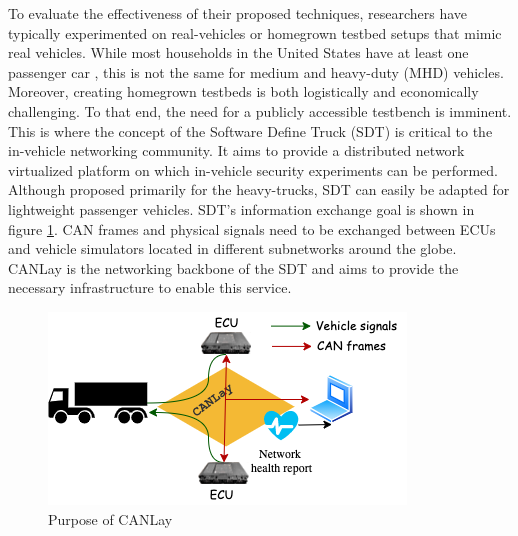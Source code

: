 \documentclass[letterpaper,twocolumn,12pt]{article}
\begin{document}
To evaluate the effectiveness of their proposed techniques, researchers have typically experimented on real-vehicles or homegrown testbed setups that mimic real vehicles. 
While most households in the United States have at least one passenger car \cite{mathilde_carlier_number_2021}, this is not the same for medium and heavy-duty (MHD) vehicles. 
Moreover, creating homegrown testbeds is both logistically and economically challenging. To that end, the need for a publicly accessible testbench is imminent. This is where the concept of the Software Define Truck (SDT) \cite{mukherjee_towards_2021} is critical to the in-vehicle networking community. It aims to provide a distributed network virtualized platform on which in-vehicle security experiments can be performed. Although proposed primarily for the heavy-trucks, SDT can easily be adapted for lightweight passenger vehicles. SDT's information exchange goal is shown in figure \ref{fig:goal}. CAN frames and physical signals need to be exchanged between ECUs and vehicle simulators located in different subnetworks around the globe. CANLay is the networking backbone of the SDT and aims to provide the necessary infrastructure to enable this service.

\begin{figure}[]
    \centering
    \includegraphics[width=\linewidth]{images/design_goal.drawio.png}
    \caption{Purpose of CANLay}
    \label{fig:goal}
\end{figure}
\end{document}
